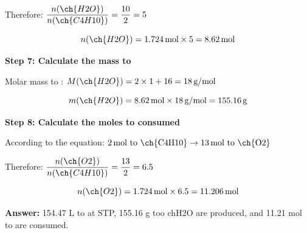 \begin{exercise}
\begin{solu}
        Therefore: $\dfrac{n(\ch{H2O})}{n(\ch{C4H10})} = \dfrac{10}{2} = 5$

        \begin{equation*}
            n(\ch{H2O}) = 1.724\,\text{mol} \times 5 = 8.62\,\text{mol}
        \end{equation*}

        \textbf{Step 7: Calculate the mass to }

        Molar mass to : $M(\ch{H2O}) = 2 \times 1 + 16 = 18\,\text{g/mol}$

        \begin{equation*}
            m(\ch{H2O}) = 8.62\,\text{mol} \times 18\,\text{g/mol} = 155.16\,\text{g}
        \end{equation*}

        \textbf{Step 8: Calculate the moles to  consumed}

        According to the equation: $2\,\text{mol to \ch{C4H10}} \rightarrow 13\,\text{mol to \ch{O2}}$

        Therefore: $\dfrac{n(\ch{O2})}{n(\ch{C4H10})} = \dfrac{13}{2} = 6.5$

        \begin{equation*}
            n(\ch{O2}) = 1.724\,\text{mol} \times 6.5 = 11.206\,\text{mol}
        \end{equation*}

        \textbf{Answer:} 154.47 L to  at STP, 155.16 g too ch{H2O} are produced, and 11.21 mol to  are consumed.
    \end{solu}
\end{exercise}

